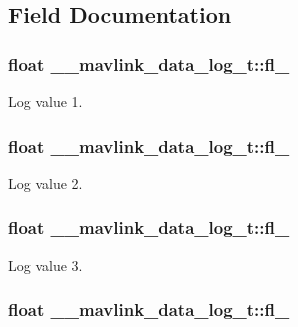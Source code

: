 \subsection{Field Documentation}
\hypertarget{struct____mavlink__data__log__t_a397e166622c053cfbed4bca8b0bb5d36}{
\subsubsection[{fl\+\_\+1}]{\setlength{\rightskip}{0pt plus 5cm}float \+\_\+\+\_\+mavlink\+\_\+data\+\_\+log\+\_\+t\+::fl\+\_}}\label{struct____mavlink__data__log__t_a397e166622c053cfbed4bca8b0bb5d36}


Log value 1. 

\hypertarget{struct____mavlink__data__log__t_a40ff76b0549715a8938ca39b82b0b59b}{
\subsubsection[{fl\+\_\+2}]{\setlength{\rightskip}{0pt plus 5cm}float \+\_\+\+\_\+mavlink\+\_\+data\+\_\+log\+\_\+t\+::fl\+\_}}\label{struct____mavlink__data__log__t_a40ff76b0549715a8938ca39b82b0b59b}


Log value 2. 

\hypertarget{struct____mavlink__data__log__t_a621ce599540d172aac7e3304ea1f672b}{
\subsubsection[{fl\+\_\+3}]{\setlength{\rightskip}{0pt plus 5cm}float \+\_\+\+\_\+mavlink\+\_\+data\+\_\+log\+\_\+t\+::fl\+\_}}\label{struct____mavlink__data__log__t_a621ce599540d172aac7e3304ea1f672b}


Log value 3. 

\hypertarget{struct____mavlink__data__log__t_a849f87475c81ba792095d02b373dc2fa}{
\subsubsection[{fl\+\_\+4}]{\setlength{\rightskip}{0pt plus 5cm}float \+\_\+\+\_\+mavlink\+\_\+data\+\_\+log\+\_\+t\+::fl\+\_}}\label{struct____mavlink__data__log__t_a849f87475c81ba792095d02b373dc2fa}



